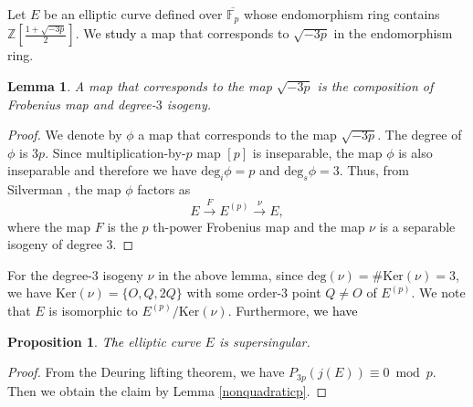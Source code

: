 \documentclass[a4paper, 11pt]{article}
\theoremstyle{plain}
\newtheorem{prop}[defn]{Proposition}
\newtheorem{lem}[defn]{Lemma}
\newcommand{\?}{\textcolor{red}{??}}
\newcommand{\fp}{\mathbb{F}_p}
\newcommand{\bZ}{\mathbb{Z}}
\begin{document}
Let $E$ be an elliptic curve defined over $\overline{\fp}$ whose endomorphism ring contains $\bZ \left[ \frac{1+\sqrt{-3p}}{2}\right]$.  We \textcolor{black}{study} a map that corresponds to $\sqrt{-3p}$ in the endomorphism ring.

\begin{lem}
\label{compof-3pmap}
    A map that corresponds to the map $\sqrt{-3p}$ is the composition of Frobenius map and degree-$3$ isogeny. 
\end{lem}

\begin{proof}
    We denote by $\phi$ a map that corresponds to the map $\sqrt{-3p}$. The degree of $\phi$ is $3p$. Since multiplication-by-$p$ map $[p]$ is inseparable, the map $\phi$ is also inseparable and therefore we have ${\text{deg}}_i{\phi}=p$ and ${\text{deg}}_s{\phi}=3$. Thus, from Silverman \cite[Corolary 2.2]{AEC}, the map $\phi$ factors as
    \[
    E \overset{F}{\longrightarrow} E^{(p)} \overset{\nu}{\longrightarrow} E, 
    \]
    where the map $F$ is the $p$ th-power Frobenius map and the map $\nu$ is a separable isogeny of degree $3$.  
\end{proof}
For the degree-$3$ isogeny $\nu$ in the above lemma, since $\text{deg}(\nu)= \# \text{Ker}(\nu)=3$, we have $\text{Ker}(\nu)=\{O,Q,2Q\}$ with some order-3 point $Q\ne O$ of $E^{(p)}$. 
We note that $E$ is isomorphic to $E^{(p)}/\text{Ker}(\nu)$.
%
Furthermore, \textcolor{black}{we have}
\begin{prop}
    \textcolor{black}{The} elliptic curve $E$ is supersingular. 
\end{prop}
\begin{proof}
    From the Deuring lifting theorem, we have $P_{3p}(j(E))\equiv0 \bmod p$. Then we obtain the claim by Lemma \ref{nonquadraticp}.
\end{proof}
\end{document}
